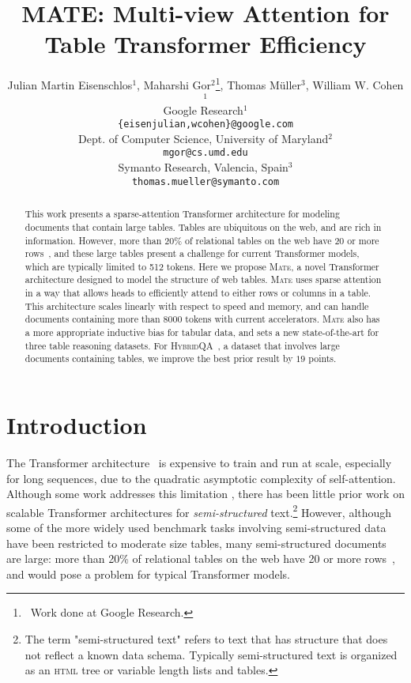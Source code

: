 \documentclass[11pt]{article}
\title{MATE: Multi-view Attention for Table Transformer Efficiency}
\author{
Julian Martin Eisenschlos$^1$,
Maharshi Gor$^2$\thanks{\,\,\,Work done at Google Research.},
Thomas M{\"u}ller$^3$\footnotemark[1],
William W. Cohen$^1$\\
Google Research$^1$ \\
\texttt{\{eisenjulian,wcohen\}@google.com}\\
Dept. of Computer Science, University of Maryland$^2$ \\
\texttt{mgor@cs.umd.edu}\\
Symanto Research, Valencia, Spain$^3$ \\
\texttt{thomas.mueller@symanto.com}
}
\newcommand{\abr}[1]{\textsc{#1}}
\newcommand\hqa{\textsc{HybridQA}\xspace}
\newcommand{\model}{\textsc{Mate}\xspace}
\begin{document}
\newtheorem{theorem}{Theorem}
\newtheorem*{theorem*}{Theorem}
\newtheorem{lemma}[theorem]{Lemma}

\maketitle

\begin{abstract}
    This work presents a sparse-attention Transformer architecture for modeling documents that contain large tables.
Tables are ubiquitous on the web, and are rich in information. However,
more than 20\% of relational tables on the web have 20 or more rows~\cite{cafarella-2008-relweb}, and these large tables present a challenge for current Transformer models, which are typically limited to 512 tokens.
Here we propose \model, a novel Transformer architecture designed to model the structure of web tables. \model uses sparse attention in a way that allows heads to efficiently attend to either rows or columns in a table.
This architecture scales linearly with respect to speed and memory, and can handle documents containing more than 8000 tokens with current accelerators.
\model also has a more appropriate inductive bias for tabular data, and sets a new state-of-the-art for three table reasoning datasets.
For \hqa~\cite{chen-etal-2020-hybridqa}, a dataset that involves large documents containing tables, we improve the best prior result by $19$ points.
 \end{abstract}

\section{Introduction}
\label{sec:intro}

The Transformer architecture~\cite{vaswani17} is expensive to train and run at scale, especially for long sequences, due to the quadratic asymptotic complexity of self-attention.  Although some work addresses this limitation \cite{ainslie-etal-2020-etc, kitaev2020reformer, zaheer2020bigbird}, there has been little prior work
on scalable Transformer architectures for \emph{semi-structured} text.\footnote{The term "semi-structured text" refers to text that has structure that does not reflect a known data schema.  Typically semi-structured text is organized as an \abr{html} tree or variable length lists and tables.}  However, although some of the more widely used benchmark tasks involving semi-structured data have been restricted to moderate size tables, many semi-structured documents are large: more than 20\% of relational tables on the web have 20 or more rows~\cite{cafarella-2008-relweb}, and would pose a problem for typical Transformer models.
\end{document}
